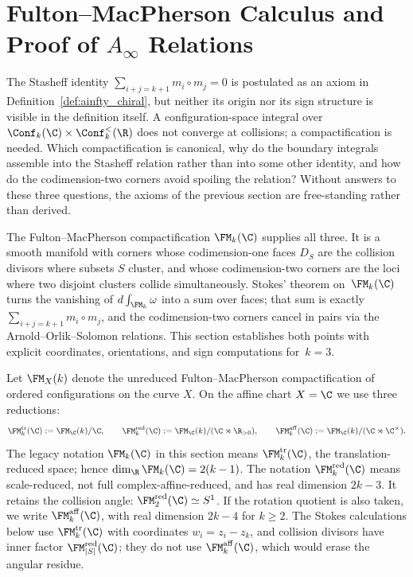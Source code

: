 \section{\texorpdfstring{Fulton--MacPherson Calculus and Proof of $A_\infty$ Relations}{Fulton--MacPherson Calculus and Proof of A-infinity Relations}}
\label{sec:FM_calculus}

The Stasheff identity
$\sum_{i+j = k+1} m_i \circ m_j = 0$ is postulated as an axiom
in Definition~\ref{def:ainfty_chiral}, but neither its origin
nor its sign structure is visible in the definition itself. A
configuration-space integral over $\Conf_k(\C) \times
\Conf_k^{<}(\R)$ does not converge at collisions; a
compactification is needed. Which compactification is
canonical, why do the boundary integrals assemble into the
Stasheff relation rather than into some other identity, and how
do the codimension-two corners avoid spoiling the relation?
Without answers to these three questions, the axioms of the
previous section are free-standing rather than derived.

The Fulton--MacPherson compactification $\FM_k(\C)$ supplies
all three. It is a smooth manifold with corners whose
codimension-one faces $D_S$ are the collision divisors where
subsets $S$ cluster, and whose codimension-two corners are the
loci where two disjoint clusters collide simultaneously.
Stokes' theorem on~$\FM_k(\C)$ turns the vanishing of
$d\int_{\FM_k} \omega$ into a sum over faces; that sum is
exactly $\sum_{i+j = k+1} m_i \circ m_j$, and the
codimension-two corners cancel in pairs via the
Arnold--Orlik--Solomon relations. This section establishes
both points with explicit coordinates, orientations, and sign
computations for~$k = 3$.

\begin{remark}
\label{rem:FM-convention}
Let \(\FM_X(k)\) denote the unreduced Fulton--MacPherson
compactification of ordered configurations on the curve \(X\).  On the
affine chart \(X=\C\) we use three reductions:
\[
\FM_k^{\mathrm{tr}}(\C):=\FM_{\C}(k)/\C,\qquad
\FM_k^{\mathrm{red}}(\C):=\FM_{\C}(k)/(\C\rtimes\R_{>0}),\qquad
\FM_k^{\mathrm{aff}}(\C):=\FM_{\C}(k)/(\C\rtimes\C^\times).
\]
The legacy notation \(\FM_k(\C)\) in this section means
\(\FM_k^{\mathrm{tr}}(\C)\), the translation-reduced space; hence
\(\dim_\R\FM_k(\C)=2(k-1)\).  The notation
\(\FM_k^{\mathrm{red}}(\C)\) means scale-reduced, not full
complex-affine-reduced, and has real dimension \(2k-3\).  It retains
the collision angle: \(\FM_2^{\mathrm{red}}(\C)\simeq S^1\).  If the
rotation quotient is also taken, we write \(\FM_k^{\mathrm{aff}}(\C)\),
with real dimension \(2k-4\) for \(k\ge2\).  The Stokes calculations
below use \(\FM_k^{\mathrm{tr}}(\C)\) with coordinates
\(w_i=z_i-z_k\), and collision divisors have inner factor
\(\FM_{|S|}^{\mathrm{red}}(\C)\); they do not use
\(\FM_k^{\mathrm{aff}}(\C)\), which would erase the angular residue.
\end{remark}

